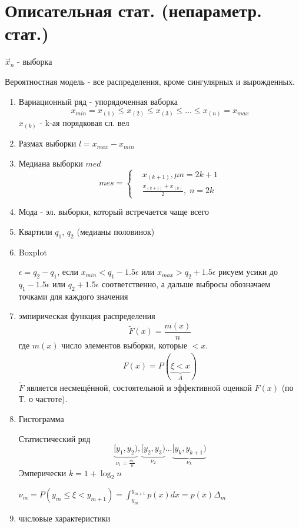\documentclass{article}
\begin{document}
\section{Описательная стат. (непараметр. стат.)}
$\vec{x}_n$ - выборка

Вероятностная модель - все распределения, кроме сингулярных и вырожденных.
\begin{enumerate}
  \item Вариационный ряд - упорядоченная ваборка
    \[
      x_{min}=x_{(1)}\le x_{(2)}\le x_{(3)} \le \dots \le x_{(n)}=x_{max}
    \]
    $x_{(k)}$ - k-ая порядковая сл. вел
  \item Размах выборки $l=x_{max}-x_{min}$
  \item Медиана выборки $med$
    \[
      mes =\left\{\begin{aligned}
        & x_{(k+1)}, \mu n=2k+1 \\ 
        & \frac{x_{(k+1)}+x_{(k)}}{2}, \; n=2k
      \end{aligned}\right.
    \]
  \item Мода - эл. выборки, который встречается чаще всего
  \item Квартили $q_1$, $q_2$ (медианы половинок)
  \item Boxplot

    $\epsilon=q_2-q_1$, если $x_{min}<q_1-1.5\epsilon$ или $x_{max}>q_2+1.5\epsilon$
    рисуем усики до $q_1-1.5\epsilon$ или $q_2+1.5\epsilon$ соответственно,
    а дальше выбросы обозначаем точками для каждого значения
  \item эмпирическая функция распределения
    \[
      \tilde{F}(x)=\frac{m(x)}{n}
    \]
    где $m(x)$ число элементов выборки, которые $<x$.
    \begin{gather*}
      F(x)=P(\underbrace{\xi<x}_{A})
    \end{gather*}
    $\tilde{F}$ является несмещённой, состоятельной и эффективной оценкой $F(x)$
    (по Т. о частоте).
  \item Гистограмма

    Статистический ряд
    \[
      \underbrace{[y_1,y_2)}_{\nu_1=\frac{m_1}{n}}, \underbrace{[y_2,y_3)}_{\nu_2}\dots \underbrace{[y_k,y_{k+1})}_{\nu_k}
    \]
    Эмперически $k=1+\log_2 n$
    
    
    $\nu_m=P(y_m \le \xi < y_{m+1})=\int_{y_m}^{y_{m+1}}p(x)dx=p(\bar{x})\Delta_m$
  \item числовые характеристики


\end{enumerate}
\end{document}
